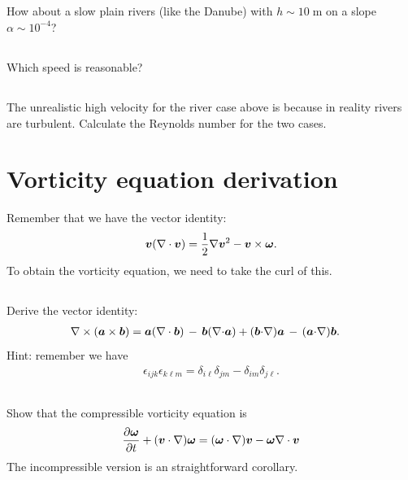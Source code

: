 \documentclass[11pt,letterpaper]{article}
\begin{document}
\subsection{}
How about a slow plain rivers (like the Danube) with $h \sim 10\;\text{m}$ on a slope $\alpha\sim 10^{-4}$?

\subsection{}
Which speed is reasonable?

\subsection{}
The unrealistic high velocity for the river case above is because in reality rivers are turbulent. Calculate the Reynolds number for the two cases.

\section{Vorticity equation derivation}
Remember that we have the vector identity:
\begin{align}
    \boldsymbol{v}(\nabla\cdot\boldsymbol{v}) = \frac{1}{2}\nabla\boldsymbol{v}^2-\boldsymbol{v}\times\boldsymbol{\omega}.\label{eq:lamb_ident}
\end{align}
To obtain the vorticity equation, we need to take the curl of this. 

\subsection{}
Derive the vector identity:
\begin{align}
    \nabla\times(\boldsymbol{a}\times\boldsymbol{b}) &= \boldsymbol{a}(\nabla \cdot \boldsymbol{b}) \,-\, \boldsymbol{b}(\nabla {\cdot} \boldsymbol{a})+(\boldsymbol{b} {\cdot} \nabla) \boldsymbol{a} \,-\, (\boldsymbol{a} {\cdot} \nabla) \boldsymbol{b}.
\end{align}
Hint: remember we have
\begin{align}
    \epsilon_{ijk}\epsilon_{k\ell m} = \delta_{i\ell}\delta_{jm}-\delta_{im}\delta_{j\ell}.\label{eq:perm_prod_ident}
\end{align}

\subsection{}
Show that the compressible vorticity equation is
\begin{align}
    \frac{\partial\boldsymbol{\omega}}{\partial t}+(\boldsymbol{v}\cdot \nabla)\boldsymbol{\omega} = (\boldsymbol{\omega}\cdot \nabla)\boldsymbol{v}-\boldsymbol{\omega}\nabla\cdot\boldsymbol{v}
\end{align}
The incompressible version is an straightforward corollary. 
\end{document}
